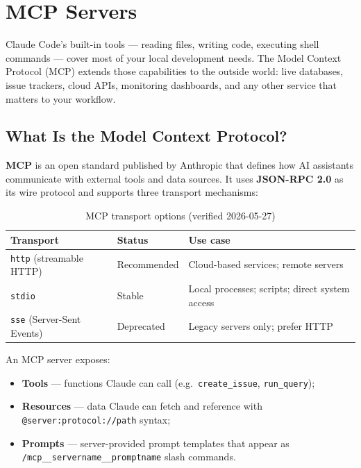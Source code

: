 \chapter{MCP Servers}
\label{ch:mcp-servers}


Claude Code's built-in tools — reading files, writing code, executing shell
commands — cover most of your local development needs. The Model Context
Protocol (MCP) extends those capabilities to the outside world: live databases,
issue trackers, cloud APIs, monitoring dashboards, and any other service that
matters to your workflow.

\section{What Is the Model Context Protocol?}
\label{sec:mcp-what}

\textbf{MCP} is an open standard published by Anthropic that defines how AI
assistants communicate with external tools and data sources. It uses
\textbf{JSON-RPC 2.0} as its wire protocol and supports three transport
mechanisms:

\begin{table}[ht]
\centering
\caption{MCP transport options (verified 2026-05-27)}
\label{tab:mcp-transports}
\begin{tabularx}{\textwidth}{llX}
\toprule
\textbf{Transport} & \textbf{Status} & \textbf{Use case} \\
\midrule
\texttt{http} (streamable HTTP) & Recommended & Cloud-based services; remote servers \\
\texttt{stdio}                  & Stable       & Local processes; scripts; direct system access \\
\texttt{sse} (Server-Sent Events) & Deprecated & Legacy servers only; prefer HTTP \\
\bottomrule
\end{tabularx}
\end{table}

An MCP server exposes:
\begin{itemize}
  \item \textbf{Tools} — functions Claude can call
        (e.g.\ \texttt{create\_issue}, \texttt{run\_query});
  \item \textbf{Resources} — data Claude can fetch and reference with
        \texttt{@server:protocol://path} syntax;
  \item \textbf{Prompts} — server-provided prompt templates that appear as
        \texttt{/mcp\_\_servername\_\_promptname} slash commands.
\end{itemize}

